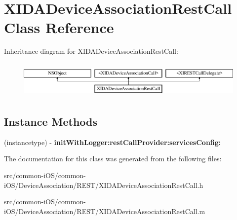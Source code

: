 \hypertarget{interface_x_i_d_a_device_association_rest_call}{}\section{X\+I\+D\+A\+Device\+Association\+Rest\+Call Class Reference}
\label{interface_x_i_d_a_device_association_rest_call}
Inheritance diagram for X\+I\+D\+A\+Device\+Association\+Rest\+Call\+:\begin{figure}[H]
\begin{center}
\leavevmode
\includegraphics[height=1.857380cm]{interface_x_i_d_a_device_association_rest_call}
\end{center}
\end{figure}
\subsection*{Instance Methods}
\begin{DoxyCompactItemize}
\item 
\hypertarget{interface_x_i_d_a_device_association_rest_call_aeed06c0e8b95ef533d2aa209dd3616a9}{}\label{interface_x_i_d_a_device_association_rest_call_aeed06c0e8b95ef533d2aa209dd3616a9} 
(instancetype) -\/ {\bfseries init\+With\+Logger\+:rest\+Call\+Provider\+:services\+Config\+:}
\end{DoxyCompactItemize}


The documentation for this class was generated from the following files\+:\begin{DoxyCompactItemize}
\item 
src/common-\/i\+O\+S/common-\/i\+O\+S/\+Device\+Association/\+R\+E\+S\+T/X\+I\+D\+A\+Device\+Association\+Rest\+Call.\+h\item 
src/common-\/i\+O\+S/common-\/i\+O\+S/\+Device\+Association/\+R\+E\+S\+T/X\+I\+D\+A\+Device\+Association\+Rest\+Call.\+m\end{DoxyCompactItemize}
